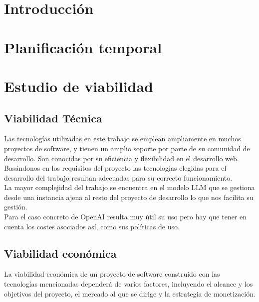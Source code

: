 
\section{Introducción}

\section{Planificación temporal}

\section{Estudio de viabilidad}

\subsection{Viabilidad Técnica}

Las tecnologías utilizadas en este trabajo se emplean ampliamente en muchos proyectos de software, y 
tienen un amplio soporte por parte de su comunidad de desarrollo. Son conocidas por su eficiencia y 
flexibilidad en el desarrollo web.\\
Basándonos en los requisitos del proyecto las tecnologías elegidas para el desarrollo del trabajo 
resultan adecuadas para su correcto funcionamiento.\\
La mayor complejidad del trabajo se encuentra en el modelo LLM que se gestiona desde una instancia ajena al 
resto del proyecto de desarrollo lo que nos facilita su gestión.\\
Para el caso concreto de OpenAI resulta muy útil su uso pero hay que tener en cuenta los costes asociados 
así, como sus políticas de uso.

\subsection{Viabilidad económica}
La viabilidad económica de un proyecto de software construido con las tecnologías 
mencionadas dependerá de varios factores, incluyendo el alcance y los objetivos del proyecto, 
el mercado al que se dirige y la estrategia de monetización.

